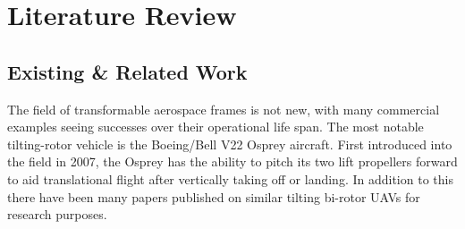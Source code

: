 \section{Literature Review}
\label{sec:intro.litreview}
\subsection{Existing \& Related Work}
\label{subsec:intro.lit.related}
The field of transformable aerospace frames is not new, with many commercial examples seeing successes over their operational life span. The most notable tilting-rotor vehicle is the Boeing/Bell V22 Osprey\cite{osprey} aircraft. First introduced into the field in 2007, the Osprey has the ability to pitch its two lift propellers forward to aid translational flight after vertically taking off or landing. In addition to this there have been many papers published on similar tilting bi-rotor UAVs for research purposes.
